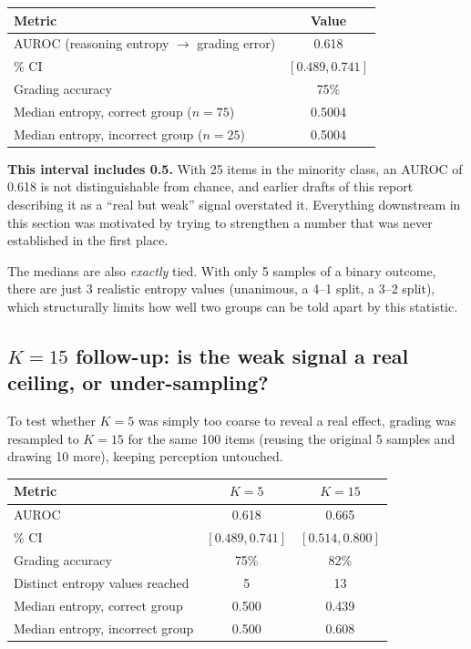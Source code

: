 \documentclass[11pt]{article}
\begin{document}
\begin{center}
\begin{tabular}{lc}
\toprule
Metric & Value \\
\midrule
AUROC (reasoning entropy $\rightarrow$ grading error) & 0.618 \\
\quad 95\% CI & $[0.489, 0.741]$ \\
Grading accuracy & 75\% \\
Median entropy, correct group ($n=75$) & 0.5004 \\
Median entropy, incorrect group ($n=25$) & 0.5004 \\
\bottomrule
\end{tabular}
\end{center}

\textbf{This interval includes 0.5.} With 25 items in the minority class, an
AUROC of 0.618 is not distinguishable from chance, and earlier drafts of this
report describing it as a ``real but weak'' signal overstated it. Everything
downstream in this section was motivated by trying to strengthen a number that
was never established in the first place.

The medians are also \emph{exactly} tied. With only 5 samples of a binary
outcome, there are just 3 realistic entropy values (unanimous, a 4--1 split, a
3--2 split), which structurally limits how well two groups can be told apart by
this statistic.

\subsection{$K=15$ follow-up: is the weak signal a real ceiling, or under-sampling?}

To test whether $K=5$ was simply too coarse to reveal a real effect, grading
was resampled to $K=15$ for the same 100 items (reusing the original 5
samples and drawing 10 more), keeping perception untouched.

\begin{center}
\begin{tabular}{lcc}
\toprule
Metric & $K=5$ & $K=15$ \\
\midrule
AUROC & 0.618 & 0.665 \\
\quad 95\% CI & $[0.489, 0.741]$ & $[0.514, 0.800]$ \\
Grading accuracy & 75\% & 82\% \\
Distinct entropy values reached & 5 & 13 \\
Median entropy, correct group & 0.500 & 0.439 \\
Median entropy, incorrect group & 0.500 & 0.608 \\
\bottomrule
\end{tabular}
\end{center}
\end{document}
